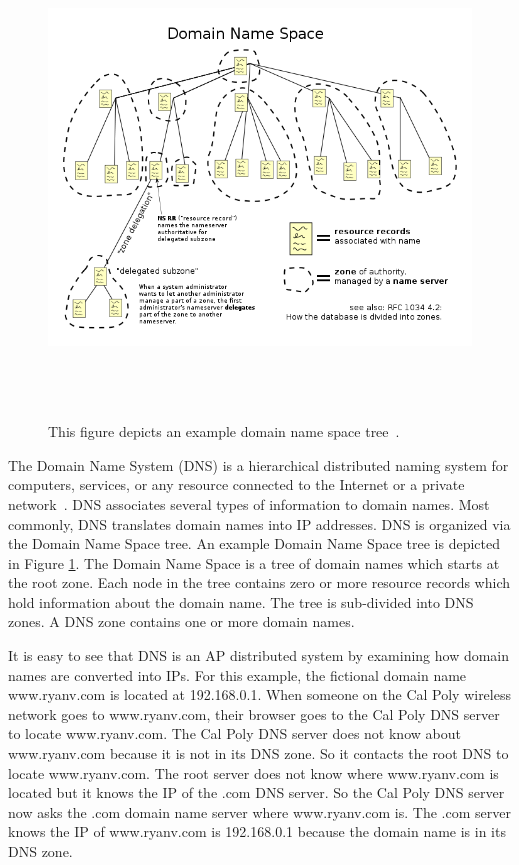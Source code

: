 \documentclass[12pt]{ucthesis}
\newcommand{\captionfonts}{\small\bf\ssp}
\begin{document}
\begin{figure}[H]
\begin{center}
\includegraphics[height=120mm]{dns.png}
\captionfonts
\caption[Example domain name space tree]{This figure depicts an example domain name space tree~\cite{dns}.}
\label{fig:dns}
\end{center}
\end{figure}

The Domain Name System (DNS) is a hierarchical distributed naming system for computers, services, or any resource connected to the Internet or a private network~\cite{dns}. DNS associates several types of information to domain names. Most commonly, DNS translates domain names into IP addresses. DNS is organized
via the Domain Name Space tree. An example Domain Name Space tree is depicted in Figure \ref{fig:dns}. The Domain Name Space is a tree of domain names which starts at the root zone. Each node in the tree contains zero or more resource records which hold information about the domain name. The tree is sub-divided into DNS zones. A DNS zone contains one or more domain names.

It is easy to see that DNS is an AP distributed system by examining how domain names are converted into IPs.
For this example, the fictional domain name www.ryanv.com is located at 192.168.0.1. When someone on the Cal Poly wireless network goes to www.ryanv.com, their browser goes to the Cal Poly DNS server to locate www.ryanv.com. The Cal Poly DNS server does not know about www.ryanv.com because it is not in its DNS zone. So it contacts the root DNS to locate www.ryanv.com. The root server does not know where www.ryanv.com is located but it knows the IP of the .com DNS server. So the Cal Poly DNS server now asks the .com domain name server where www.ryanv.com is. The .com server knows the IP of www.ryanv.com is 192.168.0.1 because the domain name is in its DNS zone. 
\end{document}
